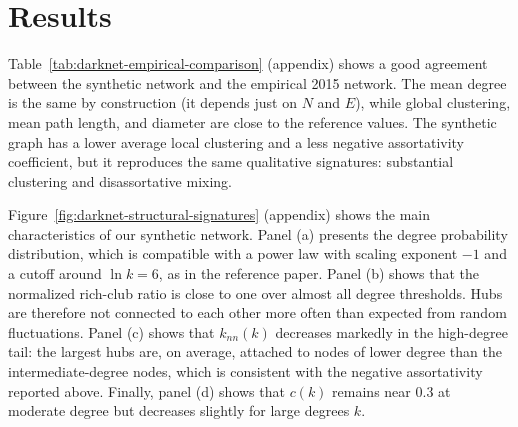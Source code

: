 \section{Results}


\begingroup\normalsize
Table~\ref{tab:darknet-empirical-comparison} (appendix) shows a good agreement between the synthetic network and the empirical 2015 network. The mean
degree is the same by construction (it depends just on $N$ and $E$), while global clustering, mean path length, and
diameter are close to the reference values. The synthetic graph has a lower
average local clustering and a less negative assortativity coefficient, but it
reproduces the same qualitative signatures: substantial clustering and
disassortative mixing.
\endgroup

\begingroup\normalsize
Figure~\ref{fig:darknet-structural-signatures} (appendix) shows the main characteristics
of our synthetic network. Panel (a) presents the degree probability
distribution, which is compatible with a power law with scaling exponent $-1$
and a cutoff around $\ln k=6$, as in the reference paper. Panel (b) shows that
the normalized rich-club ratio is close to one over almost all degree
thresholds. Hubs are therefore not connected to each other more often than
expected from random fluctuations. Panel (c) shows that $k_{nn}(k)$ decreases markedly in the high-degree tail:
the largest hubs are, on average, attached to nodes of lower degree than the
intermediate-degree nodes, which is consistent with the negative assortativity
reported above. Finally, panel (d) shows that $c(k)$ remains near $0.3$ at
moderate degree but decreases slightly for large degrees $k$.
\endgroup

\endgroup

